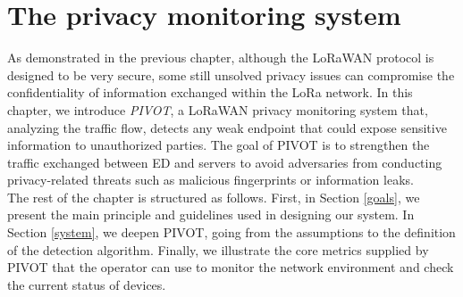 \chapter{The privacy monitoring system}
\label{pivot}
As demonstrated in the previous chapter, although the LoRaWAN protocol is designed to be very secure, some still unsolved privacy issues can compromise the confidentiality of information exchanged within the LoRa network. In this chapter, we introduce \textit{PIVOT}, a LoRaWAN privacy monitoring system that, analyzing the traffic flow, detects any weak endpoint that could expose sensitive information to unauthorized parties. The goal of PIVOT is to strengthen the traffic exchanged between ED and servers to avoid adversaries from conducting privacy-related threats such as malicious fingerprints or information leaks.
\\
The rest of the chapter is structured as follows. First, in Section \ref{goals}, we present the main principle and guidelines used in designing our system. In Section \ref{system}, we deepen PIVOT, going from the assumptions to the definition of the detection algorithm. Finally, we illustrate the core metrics supplied by PIVOT that the operator can use to monitor the network environment and check the current status of devices.
\vspace{5mm}

